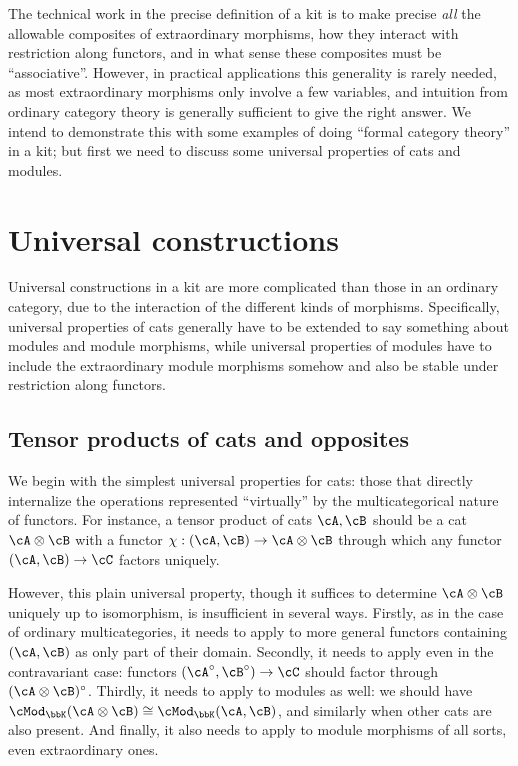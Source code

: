 \documentclass{amsart}
\newcommand{\A}{\cA}
\newcommand{\B}{\cB}
\newcommand{\C}{\cC}
\newcommand{\K}{\bbK}
\let\mod\cMod
\def\modk{\mod_\K}
\renewcommand{\o}{^{\circ}}
\begin{document}
The technical work in the precise definition of a kit is to make precise \emph{all} the allowable composites of extraordinary morphisms, how they interact with restriction along functors, and in what sense these composites must be ``associative''.
However, in practical applications this generality is rarely needed, as most extraordinary morphisms only involve a few variables, and intuition from ordinary category theory is generally sufficient to give the right answer.
We intend to demonstrate this with some examples of doing ``formal category theory'' in a kit; but first we need to discuss some universal properties of cats and modules.

\section{Universal constructions}
\label{sec:univ}

Universal constructions in a kit are more complicated than those in an ordinary category, due to the interaction of the different kinds of morphisms.
Specifically, universal properties of cats generally have to be extended to say something about modules and module morphisms, while universal properties of modules have to include the extraordinary module morphisms somehow and also be stable under restriction along functors.

\subsection{Tensor products of cats and opposites}
\label{sec:tens-opp}

We begin with the simplest universal properties for cats: those that directly internalize the operations represented ``virtually'' by the multicategorical nature of functors.
For instance, a tensor product of cats $\A,\B$ should be a cat $\A\otimes \B$ with a functor $\chi:(\A,\B)\to \A\otimes \B$ through which any functor $(\A,\B)\to \C$ factors uniquely.

However, this plain universal property, though it suffices to determine $\A\otimes \B$ uniquely up to isomorphism, is insufficient in several ways.
Firstly, as in the case of ordinary multicategories, it needs to apply to more general functors containing $(\A,\B)$ as only part of their domain.
Secondly, it needs to apply even in the contravariant case: functors $(\A\o,\B\o)\to \C$ should factor through $(\A\otimes \B)\o$.
Thirdly, it needs to apply to modules as well: we should have $\modk(\A\otimes \B)\cong \modk(\A,\B)$, and similarly when other cats are also present.
And finally, it also needs to apply to module morphisms of all sorts, even extraordinary ones.
\end{document}
